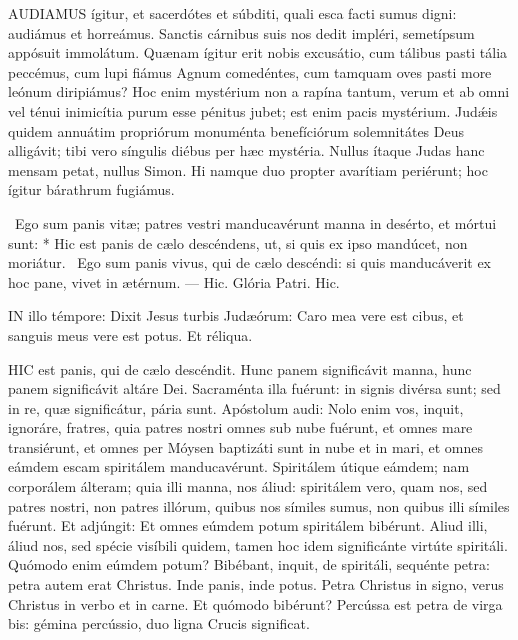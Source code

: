 \lettrine[lines=2]{A}{UDIAMUS} ígitur, et sacerdótes et súbditi, quali esca facti sumus digni: audiámus et horreámus. Sanctis cárnibus suis nos dedit impléri, semetípsum appósuit immolátum. Quænam ígitur erit nobis excusátio, cum tálibus pasti tália peccémus, cum lupi fiámus Agnum comedéntes, cum tamquam oves pasti more leónum diripiámus? Hoc enim mystérium non a rapína tantum, verum et ab omni vel ténui inimicítia purum esse pénitus jubet; est enim pacis mystérium. Judǽis quidem annuátim propriórum monuménta benefíciórum solemnitátes Deus alligávit; tibi vero síngulis diébus per hæc mystéria. Nullus ítaque Judas hanc mensam petat, nullus Simon. Hi namque duo propter avarítiam periérunt; hoc ígitur bárathrum fugiámus.

\R\ Ego sum panis vitæ; patres vestri manducavérunt manna in desérto, et mórtui sunt: * Hic est panis de cælo descéndens, ut, si quis ex ipso mandúcet, non moriátur. \V\ Ego sum panis vivus, qui de cælo descéndi: si quis manducáverit ex hoc pane, vivet in ætérnum. --- Hic. Glória Patri. Hic.




\lettrine[lines=2]{I}{N} illo témpore: Dixit Jesus turbis Judæórum: Caro mea vere est cibus, et sanguis meus vere est potus. Et réliqua.



\lettrine[lines=2]{H}{IC} est panis, qui de cælo descéndit. Hunc panem significávit manna, hunc panem significávit altáre Dei. Sacraménta illa fuérunt: in signis divérsa sunt; sed in re, quæ significátur, pária sunt. Apóstolum audi: Nolo enim vos, inquit, ignoráre, fratres, quia patres nostri omnes sub nube fuérunt, et omnes mare transiérunt, et omnes per Móysen baptizáti sunt in nube et in mari, et omnes eámdem escam spiritálem manducavérunt. Spiritálem útique eámdem; nam corporálem álteram; quia illi manna, nos áliud: spiritálem vero, quam nos, sed patres nostri, non patres illórum, quibus nos símiles sumus, non quibus illi símiles fuérunt. Et adjúngit: Et omnes eúmdem potum spiritálem bibérunt. Aliud illi, áliud nos, sed spécie visíbili quidem, tamen hoc idem significánte virtúte spiritáli. Quómodo enim eúmdem potum? Bibébant, inquit, de spiritáli, sequénte petra: petra autem erat Christus. Inde panis, inde potus. Petra Christus in signo, verus Christus in verbo et in carne. Et quómodo bibérunt? Percússa est petra de virga bis: gémina percússio, duo ligna Crucis significat.

